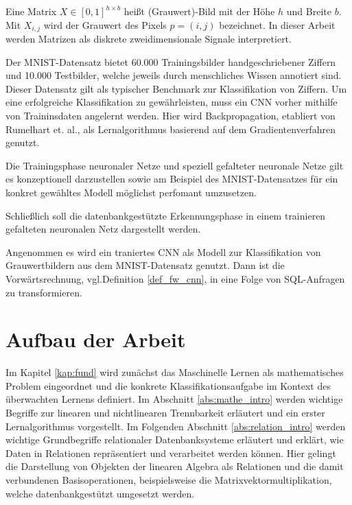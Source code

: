 \begin{defi}
    \label{def:image}
    Eine Matrix $X \in [0,1]^{h \times b}$ heißt (Grauwert)-Bild mit der Höhe $h$ und Breite $b$. Mit $X_{i,j}$ wird der Grauwert des Pixels $p=(i,j)$ bezeichnet. In dieser Arbeit werden Matrizen als diskrete zweidimensionale Signale interpretiert.
\end{defi}
Der MNIST-Datensatz bietet 60.000 Trainingsbilder handgeschriebener Ziffern und 10.000 Testbilder, welche jeweils durch menschliches
Wissen annotiert sind. Dieser Datensatz gilt als typischer Benchmark zur Klassifikation von Ziffern. Um eine erfolgreiche Klassifikation zu gewährleisten, muss ein CNN vorher mithilfe von Traininsdaten angelernt werden. Hier wird Backpropagation, etabliert von Rumelhart et. al.\cite{MLPbook}, als Lernalgorithmus basierend auf dem Gradientenverfahren 
genutzt.
\begin{problem}
    \label{prop:train}
    Die Trainingsphase neuronaler Netze und speziell gefalteter neuronale Netze gilt es konzeptionell darzustellen sowie am Beispiel des MNIST-Datensatzes für ein konkret gewähltes Modell möglichst perfomant umzusetzen. 
\end{problem}

Schließlich soll die datenbankgestützte Erkennungsphase in einem trainieren gefalteten neuronalen Netz dargestellt werden.

\begin{problem}
    \label{prob:ffCCN}
    Angenommen es wird ein traniertes CNN als Modell zur Klassifikation von Grauwertbildern aus dem MNIST-Datensatz genutzt. Dann ist die Vorwärtsrechnung, vgl.Definition \ref{def_fw_cnn}, in eine Folge von SQL-Anfragen zu transformieren.
\end{problem}

\section*{Aufbau der Arbeit}
\label{abs:glied}
Im Kapitel \ref{kap:fund} wird zunächst das Maschinelle Lernen als mathematisches Problem eingeordnet und die konkrete Klassifikationsaufgabe im Kontext des überwachten Lernens definiert. Im Abschnitt \ref{abs:mathe_intro} werden wichtige Begriffe zur linearen und nichtlinearen Trennbarkeit erläutert und ein erster Lernalgorithmus vorgestellt. Im Folgenden Abschnitt \ref{abs:relation_intro} werden wichtige Grundbegriffe relationaler Datenbanksysteme erläutert und erklärt, wie Daten in Relationen repräsentiert und verarbeitet werden können. Hier gelingt die Darstellung von Objekten der linearen Algebra als Relationen und die damit verbundenen Basisoperationen, beispielsweise die Matrixvektormultiplikation, welche datenbankgestützt umgesetzt werden.

